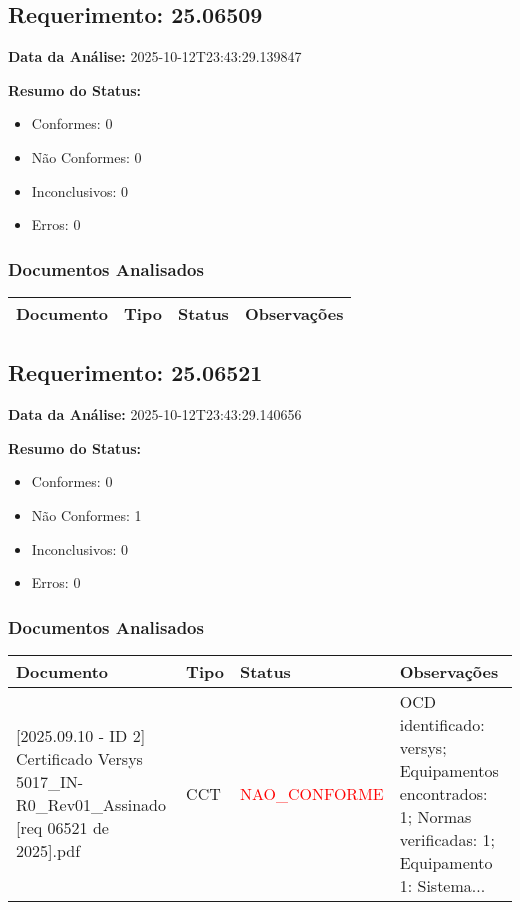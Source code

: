\documentclass[12pt,a4paper]{article}
\begin{document}
\subsection{Requerimento: 25.06509}

\textbf{Data da Análise:} 2025-10-12T23:43:29.139847

\textbf{Resumo do Status:}
\begin{itemize}
    \item Conformes: 0
    \item Não Conformes: 0
    \item Inconclusivos: 0
    \item Erros: 0
\end{itemize}

\subsubsection{Documentos Analisados}

\begin{longtable}{|p{4cm}|p{2cm}|p{2cm}|p{6cm}|}
\hline
\textbf{Documento} & \textbf{Tipo} & \textbf{Status} & \textbf{Observações} \\
\hline
\endhead
\end{longtable}


\subsection{Requerimento: 25.06521}

\textbf{Data da Análise:} 2025-10-12T23:43:29.140656

\textbf{Resumo do Status:}
\begin{itemize}
    \item Conformes: 0
    \item Não Conformes: 1
    \item Inconclusivos: 0
    \item Erros: 0
\end{itemize}

\subsubsection{Documentos Analisados}

\begin{longtable}{|p{4cm}|p{2cm}|p{2cm}|p{6cm}|}
\hline
\textbf{Documento} & \textbf{Tipo} & \textbf{Status} & \textbf{Observações} \\
\hline
\endhead
[Certificado de Conformidade Técnica - CCT][2025.09.10 - ID 2] Certificado Versys 5017\_IN-R0\_Rev01\_Assinado [req 06521 de 2025].pdf & CCT & \textcolor{red}{NAO\_CONFORME} & OCD identificado: versys; Equipamentos encontrados: 1; Normas verificadas: 1; Equipamento 1: Sistema... \\
\hline
\end{longtable}
\end{document}
